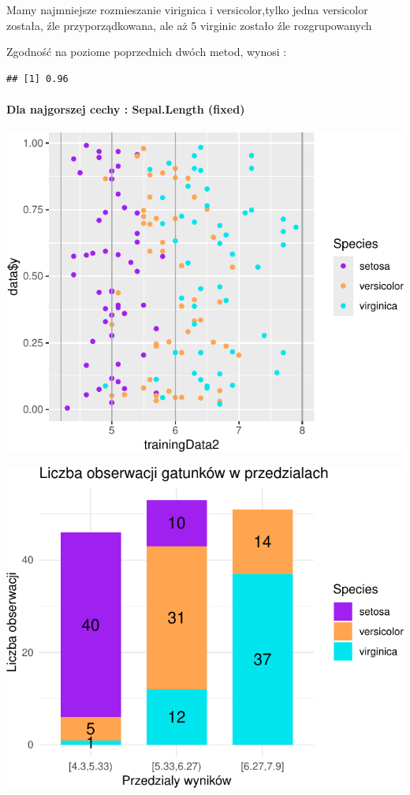\documentclass[
  12pt,
]{article}
\begin{document}
Mamy najmniejsze rozmieszanie virignica i versicolor,tylko jedna
versicolor została, źle przyporządkowana, ale aż 5 virginic zostało źle
rozgrupowanych

Zgodność na poziome poprzednich dwóch metod, wynosi :

\begin{verbatim}
## [1] 0.96
\end{verbatim}

\paragraph{Dla najgorszej cechy : Sepal.Length
(fixed)}\label{dla-najgorszej-cechy-sepal.length-fixed}

\begin{center}\includegraphics{Sprawozdanie2_files/figure-latex/givenRanges_najg-1} \end{center}

\begin{center}\includegraphics{Sprawozdanie2_files/figure-latex/tabela_kondygnacji_4_najg-1} \end{center}
\end{document}
